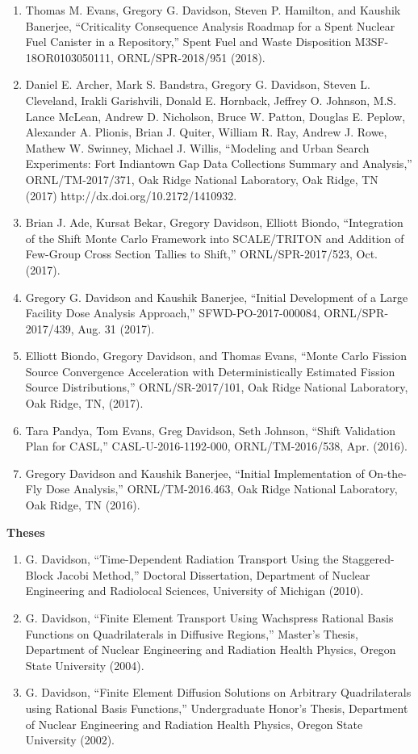 \documentclass[letterpaper,11pt]{article}
\newcommand{\leftsubheading}[1]{
  \textbf{#1\vspace{-6pt} \\}}
\begin{document}
\begin{enumerate}
  \item Thomas M. Evans, Gregory G. Davidson, Steven P. Hamilton,
    and Kaushik Banerjee, ``Criticality Consequence Analysis Roadmap
    for a Spent Nuclear Fuel Canister in a Repository,'' Spent Fuel
    and Waste Disposition M3SF-18OR0103050111, ORNL/SPR-2018/951
    (2018). 
  \item Daniel E. Archer, Mark S. Bandstra, Gregory G. Davidson,
    Steven L. Cleveland, Irakli Garishvili, Donald E. Hornback,
    Jeffrey O. Johnson, M.S. Lance McLean, Andrew D. Nicholson, Bruce
    W. Patton, Douglas E. Peplow, Alexander A. Plionis, Brian
    J. Quiter, William R. Ray, Andrew J. Rowe, Mathew W. Swinney,
    Michael J. Willis, ``Modeling and Urban Search Experiments: Fort
    Indiantown Gap Data Collections Summary and Analysis,''
    ORNL/TM-2017/371, Oak Ridge National Laboratory, Oak Ridge, TN
    (2017) http://dx.doi.org/10.2172/1410932.
  \item Brian J. Ade, Kursat Bekar, Gregory Davidson, Elliott
    Biondo, ``Integration of the Shift Monte Carlo Framework into
    SCALE/TRITON and Addition of Few-Group Cross Section Tallies to
    Shift,'' ORNL/SPR-2017/523, Oct. (2017).
  \item Gregory G. Davidson and Kaushik Banerjee, ``Initial
    Development of a Large Facility Dose Analysis Approach,''
    SFWD-PO-2017-000084, ORNL/SPR-2017/439, Aug. 31 (2017).
  \item Elliott Biondo, Gregory Davidson, and Thomas Evans, ``Monte
    Carlo Fission Source Convergence Acceleration with
    Deterministically Estimated Fission Source Distributions,''
    ORNL/SR-2017/101, Oak Ridge National Laboratory, Oak Ridge, TN,
    (2017).
  \item Tara Pandya, Tom Evans, Greg Davidson, Seth Johnson, ``Shift
    Validation Plan for CASL,'' CASL-U-2016-1192-000,
    ORNL/TM-2016/538, Apr. (2016).
  \item Gregory Davidson and Kaushik Banerjee, ``Initial
    Implementation of On-the-Fly Dose Analysis,'' ORNL/TM-2016.463,
    Oak Ridge National Laboratory, Oak Ridge, TN (2016).
\end{enumerate}


\leftsubheading{Theses}
\begin{enumerate}
  \item G. Davidson, ``Time-Dependent Radiation Transport Using the
    Staggered-Block Jacobi Method,'' Doctoral Dissertation, Department
    of Nuclear Engineering and Radiolocal Sciences, University of
    Michigan (2010).
  \item G. Davidson, ``Finite Element Transport Using Wachspress
    Rational Basis Functions on Quadrilaterals in Diffusive Regions,''
    Master's Thesis, Department of Nuclear Engineering and Radiation
    Health Physics, Oregon State University (2004).
  \item G. Davidson, ``Finite Element Diffusion Solutions on Arbitrary
    Quadrilaterals using Rational Basis Functions,'' Undergraduate
    Honor's Thesis, Department of Nuclear Engineering and Radiation
    Health Physics, Oregon State University (2002).
\end{enumerate}
\end{document}
